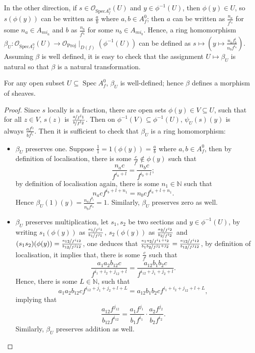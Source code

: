 \documentclass[a4paper,UKenglish,cleveref, autoref, thm-restate]{lipics-v2021}
\begin{document}
In the other direction, if $s\in \mathcal O_{\mathrm{Spec}A^0_f}(U)$ and $y\in \phi^{-1}(U)$, then $\phi(y)\in U$, so $s(\phi(y))$ can be written as $\frac{a}{b}$ where $a,b\in A^0_f$; then $a$ can be written as $\frac{n_a}{f^{i_a}}$ for some $n_a\in A_{mi_a}$ and $b$ as $\frac{n_b}{f^{i_b}}$ for some $n_b\in A_{mi_b}$. Hence, a ring homomorphism $\beta_U: \mathcal O_{\mathrm{Spec}A^0_f}(U)\to \mathcal O_{\mathrm{Proj}}\!\mid_{D(f)}(\phi^{-1}(U))$ can be defined as $s\mapsto \left(y \mapsto \frac{n_af^i_b}{n_bf^{i_a}}\right)$. Assuming $\beta$ is well defined, it is easy to check that the assignment $U\mapsto \beta_U$ is natural so that $\beta$ is a natural transformation.

\begin{lemma}\label{thm:def-beta}
    For any open subset $U\subseteq \operatorname{Spec}A^0_f$, $\beta_U$ is well-defined; hence $\beta$ defines a morphism of sheaves.
\end{lemma}
\begin{proof}
    Since $s$ locally is a fraction, there are open sets $\phi(y)\in V\subseteq U$, such that for all $z\in V$, $s(z)$ is $\frac{\nicefrac{a}{f^{l_1}}}{\nicefrac{b}{f^{l_2}}}$. Then on $\phi^{-1}(V)\subseteq \phi^{-1}(U)$, $\psi_U(s)(y)$ is always $\frac{af^{l_2}}{bf^{l_1}}$. Then it is sufficient to check that $\beta_U$ is a ring homomorphism:
    \begin{itemize}
        \item $\beta_U$ preserves one. Suppose $\frac11=1(\phi(y))=\frac a b$ where $a,b\in A^0_f$, then by definition of localisation, there is some $\frac c{f^l}\not\in \phi(y)$ such that $$\frac {n_ac}{f^{i_a+l}}=\frac {n_bc}{f^{i_b+l}};$$ by definition of localisation again, there is some $n_1\in\mathbb N$ such that $$n_acf^{i_b+l+n_1}=n_bcf^{i_a+l+n_1}.$$ Hence $\beta_U(1)(y)=\frac{n_af^{b_i}}{n_bf^{i_a}}=1$.
        Similarly, $\beta_U$ preserves zero as well. 
        \item $\beta_U$ preserves multiplication, let $s_1, s_2$ be two sections and $y\in\phi^{-1}(U)$, by writing 
        $s_1(\phi(y))$ as $\frac{\nicefrac{a_1}{f^{i_1}}}{\nicefrac{b_1}{f^{j_1}}}$, $s_2(\phi(y))$ as $\frac{\nicefrac{a_2}{f^{i_2}}}{\nicefrac{b_2}{f^{i_2}}}$ and $(s_1s_2)(\phi(y))=\frac{\nicefrac{a_{12}}{f^{i_{12}}}}{\nicefrac{b_{12}}{f^{j_{12}}}}$, one deduces that $\frac{\nicefrac{a_1a_2}{f^{i_1+i_2}}}{\nicefrac{b_1b_2}{f^{j_1+j_2}}}=\frac{\nicefrac{a_{12}}{f^{i_{12}}}}{\nicefrac{b_{12}}{f^{j_{12}}}}$, by definition of localisation, it implies that, there is some $\frac{c}{f^l}$ such that $$\frac{a_1a_2b_{12}c}{f^{i_1+i_2+j_{12}+l}}=\frac{a_{12}b_1b_2c}{f^{i_{12}+j_1+j_2+l}}.$$ Hence, there is some $L\in\mathbb N$, such that 
        $$a_1a_2b_{12}cf^{i_{12}+j_1+j_2+l+L}=a_{12}b_1b_2cf^{i_1+i_2+j_{12}+l+L},$$ implying that
        $$
        \frac{a_{12}f^{j_{12}}}{b_{12}f^{i_{12}}}=\frac{a_1f^{j_1}}{b_1f^{i_1}}\cdot\frac{a_2f^{j_2}}{b_2f^{i_2}}.
        $$ Similarly, $\beta_U$ preserves addition as well. 
    \end{itemize}
\end{proof}
\end{document}
